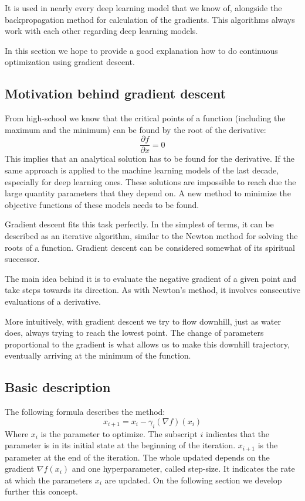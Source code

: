\documentclass[]{article}
\theoremstyle{definition}
\begin{document}
It is used in nearly every deep learning model that we know of, alongside the backpropagation method for calculation of the gradients. This algorithms always work with each other regarding deep learning models. 

In this section we hope to provide a good explanation how to do continuous optimization using gradient descent.

\subsection{Motivation behind gradient descent}
From high-school we know that the critical points of a function (including the maximum and the minimum) can be found by the root of the derivative:
\begin{equation*}
	\frac{\partial f}{\partial x} = 0
\end{equation*}
This implies that an analytical solution has to be found for the derivative. If the same approach is applied to the machine learning models of the last decade, especially for deep learning ones. These  solutions are impossible to reach due the large quantity parameters that they depend on. A new method to minimize the objective functions of these models needs to be found.

Gradient descent fits this task perfectly. In the simplest of terms, it can be described as an iterative algorithm, similar to the Newton method for solving the roots of a function. Gradient descent can be considered somewhat of its spiritual successor.

The main idea behind it is to evaluate the negative gradient of a given point and take steps towards its direction. As with Newton's method, it involves consecutive evaluations of a derivative.

More intuitively, with gradient descent we try to flow downhill, just as water does, always trying to reach the lowest point. The change of parameters proportional to the gradient is what allows us to make this downhill trajectory, eventually arriving at the minimum of the function.
 
\subsection{Basic description}
The following formula describes the method:
\begin{equation}\label{eq:basic_GD}
	x_{i+1} = x_i - \gamma_i (\nabla f)(x_i)
\end{equation}
Where $x_i$ is the parameter to optimize. The subscript $i$ indicates that the parameter is in its initial state at the beginning of the iteration. $x_{i+1}$ is the parameter at the end of the iteration. The whole updated depends on the gradient $\nabla f(x_i)$ and one hyperparameter, called step-size. It indicates the rate at which the parameters $x_i$ are updated. On the following section we develop further this concept.
\end{document}
